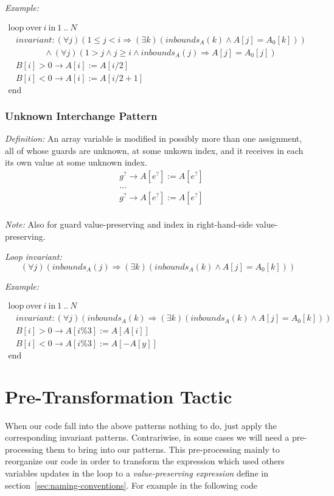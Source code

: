 \documentclass[a4paper,10pt]{article}
\newcommand{\KWloop}{\ensuremath{\mathrm{loop}~}}
\newcommand{\KWend}{\ensuremath{\mathrm{end}~}}
\newcommand{\KWover}{\ensuremath{\mathrm{over}~}}
\newcommand{\KWin}{\ensuremath{~\mathrm{in}~}}
\newcommand{\impl}{\ensuremath{\Longrightarrow}}
\newcommand{\inbounds}[2]{\ensuremath{\mathit{inbounds}_{#1}(#2)}\xspace}
\newcommand{\loopinvariant}{\noindent\textit{Loop invariant:}\xspace}
\newcommand{\patterndef}{\noindent\textit{Definition:}\xspace}
\newcommand{\patternexample}{\noindent\textit{Example:}\xspace}
\newcommand{\patternnote}{\noindent\textit{Note:}\xspace}
\begin{document}
\bigskip
\patternexample

\medskip
$\begin{array}{l}
  \KWloop \KWover i \KWin 1~..~N \\
  ~~~~ \textit{invariant}: (\forall j)(1 \leq j < i \impl (\exists k)(\inbounds{A}{k} \land A[j] = A_0[k]))\\
  ~~~~~~~~~~~~~~~~~~~ \land (\forall j)(1 > j \land j \geq i \land \inbounds{A}{j} \impl A[j] = A_0[j])\\
  ~~~~ B[i] > 0 \rightarrow A[i] := A[i/2]\\
  ~~~~ B[i] < 0 \rightarrow A[i] := A[i/2+1]\\
  \KWend
\end{array}$

\subsubsection*{Unknown Interchange Pattern}

\patterndef An array variable is modified in possibly more than one assignment,
all of whose guards are unknown, at some unkown index, and it receives in each
its own value at some unknown index.
%
\begin{eqnarray*}
&g^? \rightarrow A[e^?] := A[e^?]\\
&...\\
&g^? \rightarrow A[e^?] := A[e^?]\\
\end{eqnarray*}

\patternnote Also for guard value-preserving and index in right-hand-side value-preserving.

\medskip
\loopinvariant
%
$$(\forall j)(\inbounds{A}{j} \impl (\exists k)(\inbounds{A}{k} \land A[j] = A_0[k])) $$

\bigskip
\patternexample

\medskip
$\begin{array}{l}
  \KWloop \KWover i \KWin 1~..~N \\
  ~~~~ \textit{invariant}: (\forall j)(\inbounds{A}{k} \impl (\exists k)(\inbounds{A}{k} \land A[j] = A_0[k]))\\
  ~~~~ B[i] > 0 \rightarrow A[i\%3] := A[A[i]]\\
  ~~~~ B[i] < 0 \rightarrow A[i\%3] := A[-A[y]]\\
  \KWend
\end{array}$

\section{Pre-Transformation Tactic}
When our code fall into the above patterns nothing to do, just apply the corresponding invariant patterns. 
Contrariwise, in some cases we will need a pre-processing them to bring into our patterns. 
This pre-processing mainly to reorganize our code in order to transform the expression 
which used others variables updates in the loop to a \textit{value-preserving expression}  
define in section~\ref{sec:naming-conventions}. For example in the following code 
\end{document}
